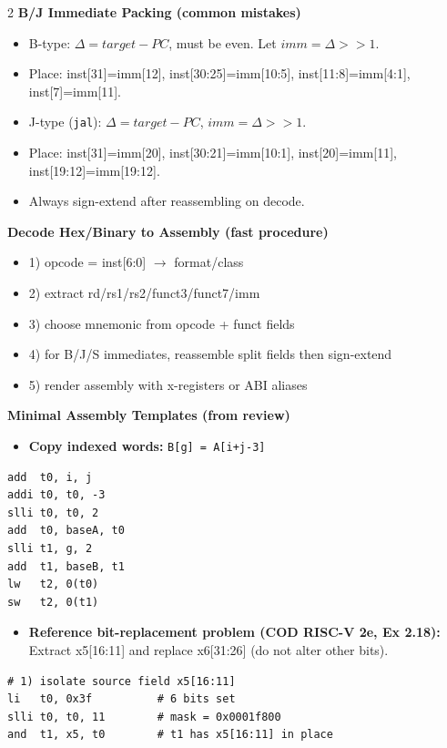 \documentclass[10pt]{article}
\newcommand{\hdr}[1]{\vspace{2pt}\textbf{#1}\vspace{1pt}\\}
\begin{document}
\begin{multicols}{2}
\hdr{B/J Immediate Packing (common mistakes)}
\scriptsize
\begin{itemize}
\item B-type: $\Delta=target-PC$, must be even. Let $imm=\Delta>>1$.
\item Place: inst[31]=imm[12], inst[30:25]=imm[10:5], inst[11:8]=imm[4:1], inst[7]=imm[11].
\item J-type (\texttt{jal}): $\Delta=target-PC$, $imm=\Delta>>1$.
\item Place: inst[31]=imm[20], inst[30:21]=imm[10:1], inst[20]=imm[11], inst[19:12]=imm[19:12].
\item Always sign-extend after reassembling on decode.
\end{itemize}
\footnotesize

\hdr{Decode Hex/Binary to Assembly (fast procedure)}
\begin{itemize}
\item 1) opcode = inst[6:0] $\to$ format/class
\item 2) extract rd/rs1/rs2/funct3/funct7/imm
\item 3) choose mnemonic from opcode + funct fields
\item 4) for B/J/S immediates, reassemble split fields then sign-extend
\item 5) render assembly with x-registers or ABI aliases
\end{itemize}

\hdr{Minimal Assembly Templates (from review)}
\begin{itemize}
\item \textbf{Copy indexed words:} \texttt{B[g] = A[i+j-3]}
\end{itemize}
\scriptsize
\begin{verbatim}
add  t0, i, j
addi t0, t0, -3
slli t0, t0, 2
add  t0, baseA, t0
slli t1, g, 2
add  t1, baseB, t1
lw   t2, 0(t0)
sw   t2, 0(t1)
\end{verbatim}
\footnotesize

\begin{itemize}
\item \textbf{Reference bit-replacement problem (COD RISC-V 2e, Ex 2.18):}\\
Extract x5[16:11] and replace x6[31:26] (do not alter other bits).
\end{itemize}
\scriptsize
\begin{verbatim}
# 1) isolate source field x5[16:11]
li   t0, 0x3f          # 6 bits set
slli t0, t0, 11        # mask = 0x0001f800
and  t1, x5, t0        # t1 has x5[16:11] in place


\end{verbatim}
\end{multicols}
\end{document}
